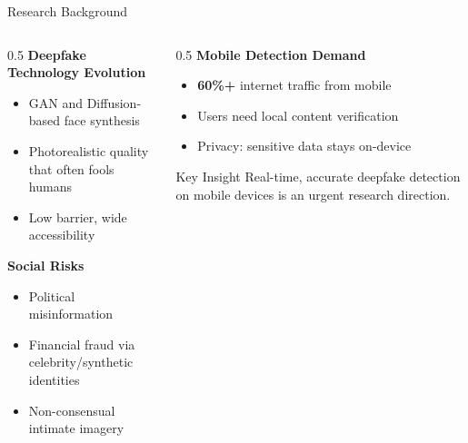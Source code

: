 \documentclass[aspectratio=169,12pt]{beamer}
\newcommand{\highlight}[1]{\textcolor{primaryblue}{\textbf{#1}}}
\begin{document}
\begin{frame}{Research Background}
\begin{columns}[T]
\begin{column}{0.5\textwidth}
\textbf{Deepfake Technology Evolution}
\begin{itemize}
    \item GAN and Diffusion-based face synthesis
    \item Photorealistic quality that often fools humans
    \item Low barrier, wide accessibility
\end{itemize}

\vspace{0.5em}
\textbf{Social Risks}
\begin{itemize}
    \item Political misinformation
    \item Financial fraud via celebrity/synthetic identities
    \item Non-consensual intimate imagery
\end{itemize}
\end{column}

\begin{column}{0.5\textwidth}
\textbf{Mobile Detection Demand}
\begin{itemize}
    \item \highlight{60\%+} internet traffic from mobile
    \item Users need local content verification
    \item Privacy: sensitive data stays on-device
\end{itemize}

\vspace{1em}
\begin{block}{Key Insight}
Real-time, accurate deepfake detection on mobile devices is an urgent research direction.
\end{block}
\end{column}
\end{columns}
\end{frame}
\end{document}
